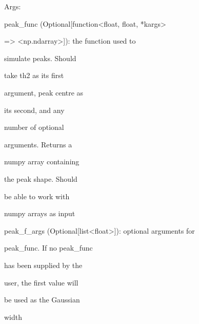 \documentclass[letterpaper,10pt,english]{sphinxmanual}
\begin{document}
\begin{fulllineitems}
\begin{fulllineitems}
\begin{DUlineblock}{0em}
\item[] Args:
\item[]
\begin{DUlineblock}{\DUlineblockindent}
\item[] peak\_func (Optional{[}function\textless{}float, float, *kargs\textgreater{}
\item[]
\begin{DUlineblock}{\DUlineblockindent}
\item[] =\textgreater{} \textless{}np.ndarray\textgreater{}{]}): the function used to
\item[]
\begin{DUlineblock}{\DUlineblockindent}
\item[] simulate peaks. Should
\item[] take th2 as its first
\item[] argument, peak centre as
\item[] its second, and any
\item[] number of optional
\item[] arguments. Returns a
\item[] numpy array containing
\item[] the peak shape. Should
\item[] be able to work with
\item[] numpy arrays as input
\end{DUlineblock}
\end{DUlineblock}
\item[] peak\_f\_args (Optional{[}list\textless{}float\textgreater{}{]}): optional arguments for
\item[]
\begin{DUlineblock}{\DUlineblockindent}
\item[] peak\_func. If no peak\_func
\item[] has been supplied by the
\item[] user, the first value will
\item[] be used as the Gaussian
\item[] width
\end{DUlineblock}
\end{DUlineblock}
\end{DUlineblock}

\end{fulllineitems}



\end{fulllineitems}
\end{document}
